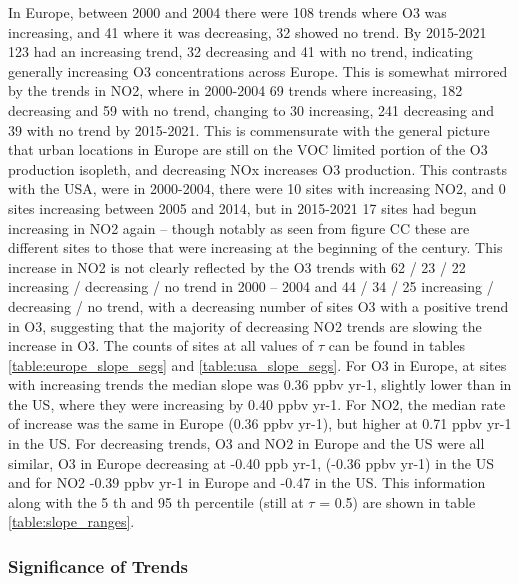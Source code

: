 \documentclass[journal abbreviation, manuscript]{copernicus}
\begin{document}
In Europe, between 2000 and 2004 there were 108 trends where O3 was increasing, and 41 where it was decreasing, 32 showed no trend. By 2015-2021 123 had an increasing trend, 32 decreasing and 41 with no trend, indicating generally increasing O3 concentrations across Europe. This is somewhat mirrored by the trends in NO2, where in 2000-2004 69 trends where increasing, 182 decreasing and 59 with no trend, changing to 30 increasing, 241 decreasing and 39 with no trend by 2015-2021. This is commensurate with the general picture that urban locations in Europe are still on the VOC limited portion of the O3 production isopleth, and decreasing NOx increases O3 production. 
This contrasts with the USA, were in 2000-2004, there were 10 sites with increasing NO2, and 0 sites increasing between 2005 and 2014, but in 2015-2021 17 sites had begun increasing in NO2 again – though notably as seen from figure CC these are different sites to those that were increasing at the beginning of the century. This increase in NO2 is not clearly reflected by the O3 trends with 62 / 23 / 22 increasing / decreasing / no trend in 2000 – 2004 and 44 / 34 / 25 increasing / decreasing / no trend, with a decreasing number of sites O3 with a positive trend in O3, suggesting that the majority of decreasing NO2 trends are slowing the increase in O3. The counts of sites at all values of $\tau$ can be found in tables \ref{table:europe_slope_segs} and \ref{table:usa_slope_segs}. 
For O3 in Europe, at sites with increasing trends the median slope was 0.36 ppbv yr-1, slightly lower than in the US, where they were increasing by 0.40 ppbv yr-1. For NO2, the median rate of increase was the same in Europe (0.36 ppbv yr-1), but higher at 0.71 ppbv yr-1 in the US. For decreasing trends, O3 and NO2 in Europe and the US were all similar, O3 in Europe decreasing at -0.40 ppb yr-1, (-0.36 ppbv yr-1) in the US and for NO2 -0.39 ppbv yr-1 in Europe and -0.47 in the US. This information along with the 5 th and 95 th percentile (still at $\tau$ = 0.5) are shown in table \ref{table:slope_ranges}. 










\subsubsection{Significance of Trends} \label{sect:significance_of_trends}
\end{document}
